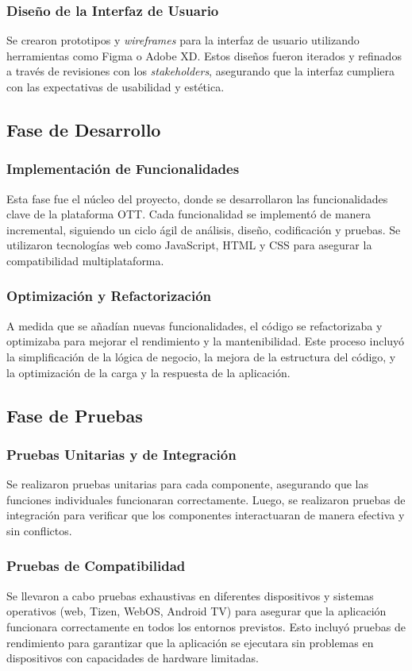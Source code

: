 \subsubsection{Diseño de la Interfaz de Usuario}
Se crearon prototipos y \textit{wireframes} para la interfaz de usuario utilizando herramientas 
como Figma o Adobe XD. Estos diseños fueron iterados y refinados a través de revisiones con los 
\textit{stakeholders}, asegurando que la interfaz cumpliera con las expectativas de usabilidad y estética.

\subsection{Fase de Desarrollo}
\subsubsection{Implementación de Funcionalidades}
Esta fase fue el núcleo del proyecto, donde se desarrollaron las funcionalidades clave de la 
plataforma OTT. Cada funcionalidad se implementó de manera incremental, siguiendo un ciclo 
ágil de análisis, diseño, codificación y pruebas. Se utilizaron tecnologías web como JavaScript, 
HTML y CSS para asegurar la compatibilidad multiplataforma.

\subsubsection{Optimización y Refactorización}
A medida que se añadían nuevas funcionalidades, el código se refactorizaba y optimizaba para 
mejorar el rendimiento y la mantenibilidad. Este proceso incluyó la simplificación de la lógica 
de negocio, la mejora de la estructura del código, y la optimización de la carga y la respuesta de la aplicación.

\subsection{Fase de Pruebas}
\subsubsection{Pruebas Unitarias y de Integración}
Se realizaron pruebas unitarias para cada componente, asegurando que las funciones individuales 
funcionaran correctamente. Luego, se realizaron pruebas de integración para verificar que los 
componentes interactuaran de manera efectiva y sin conflictos.

\subsubsection{Pruebas de Compatibilidad}
Se llevaron a cabo pruebas exhaustivas en diferentes dispositivos y sistemas operativos 
(web, Tizen, WebOS, Android TV) para asegurar que la aplicación funcionara correctamente 
en todos los entornos previstos. Esto incluyó pruebas de rendimiento para garantizar que 
la aplicación se ejecutara sin problemas en dispositivos con capacidades de hardware limitadas.

